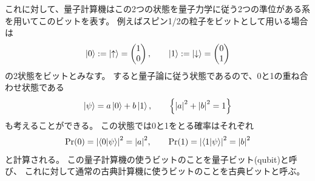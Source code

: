 \documentclass[../master.tex]{subfiles}
\begin{document}
これに対して、量子計算機はこの2つの状態を量子力学に従う2つの準位がある系を用いてこのビットを表す。
例えばスピン1/2の粒子をビットとして用いる場合は
\begin{equation}\begin{aligned}[b]
    \ket{0}:=\ket{\uparrow}=\begin{pmatrix}
        1\\0
    \end{pmatrix}, \qquad
    \ket{1}:=\ket{\downarrow}=\begin{pmatrix}
        0\\1
    \end{pmatrix}
\end{aligned}\end{equation}
の2状態をビットとみなす。
すると量子論に従う状態であるので、0と1の重ね合わせ状態である
\begin{equation}\begin{aligned}[b]
    \ket{\psi}=a\ket{0}+b\ket{1},\qquad \qty{\abs{a}^2+\abs{b}^2=1}
\end{aligned}\end{equation}
も考えることができる。
この状態では0と1をとる確率はそれぞれ
\begin{equation}\begin{aligned}[b]
    \text{Pr}(0)=\abs{\braket{0}{\psi}}^2=\abs{a}^2,\qquad
    \text{Pr}(1)=\abs{\braket{1}{\psi}}^2=\abs{b}^2
\end{aligned}\end{equation}
と計算される。
この量子計算機の使うビットのことを量子ビット(qubit)と呼び、
これに対して通常の古典計算機に使うビットのことを古典ビットと呼ぶ。
\end{document}
